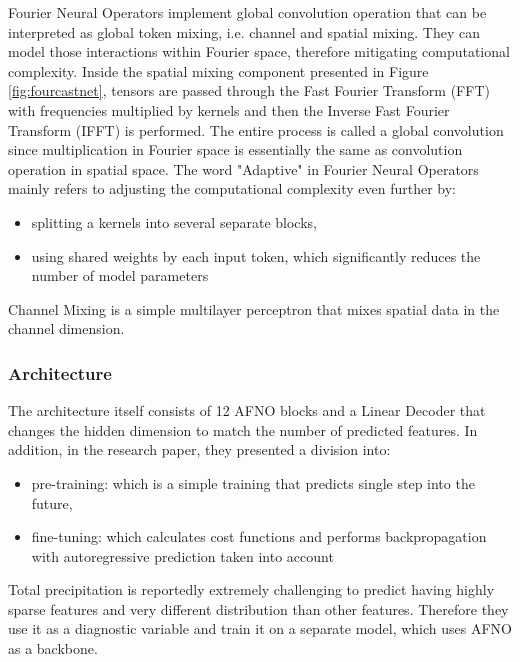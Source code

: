 Fourier Neural Operators implement global convolution operation that can be interpreted as global token mixing, i.e. channel and spatial mixing. They can model those interactions within Fourier space, therefore mitigating computational complexity. Inside the spatial mixing component presented in Figure \ref{fig:fourcastnet}, tensors are passed through the Fast Fourier Transform (FFT) with frequencies multiplied by kernels and then the Inverse Fast Fourier Transform (IFFT) is performed. The entire process is called a global convolution since multiplication in Fourier space is essentially the same as convolution operation in spatial space. The word "Adaptive" in Fourier Neural Operators mainly refers to adjusting the computational complexity even further by:
\begin{itemize}
    \item splitting a kernels into several separate blocks,
    \item using shared weights by each input token, which significantly reduces the number of model parameters
\end{itemize}

Channel Mixing is a simple multilayer perceptron that mixes spatial data in the channel dimension.

\subsubsection{Architecture}
The architecture itself consists of 12 AFNO blocks and a Linear Decoder that changes the hidden dimension to match the number of predicted features. In addition, in the research paper, they presented a division into:
\begin{itemize}
    \item pre-training: which is a simple training that predicts single step into the future,
    \item fine-tuning: which calculates cost functions and performs backpropagation with autoregressive prediction taken into account
\end{itemize}

Total precipitation is reportedly extremely challenging to predict having highly sparse features and very different distribution than other features. Therefore they use it as a diagnostic variable and train it on a separate model, which uses AFNO as a backbone.

